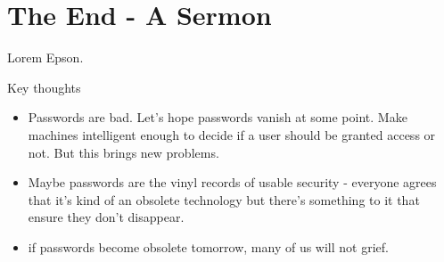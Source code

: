 
\chapter[The End - A Sermon]{The End - A Sermon}\label{chap:the_end}


Lorem Epson. 


Key thoughts

\begin{itemize}
\item Passwords are bad. Let's hope passwords vanish at some point. Make machines intelligent enough to decide if a user should be granted access or not. But this brings new problems.
\item Maybe passwords are the vinyl records of usable security - everyone agrees that it's kind of an obsolete technology but there's something to it that ensure they don't disappear. %
 \item  if passwords become obsolete tomorrow, many of us will not grief. 
 
\end{itemize}




